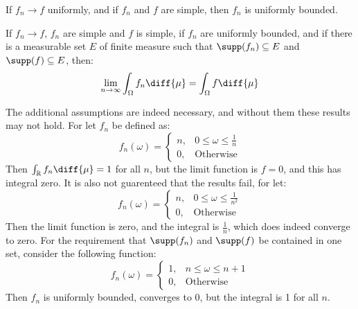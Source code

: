         \begin{theorem}
            If $f_{n}\rightarrow{f}$ uniformly, and if $f_{n}$ and $f$ are
            simple, then $f_{n}$ is uniformly bounded.
        \end{theorem}
        \begin{theorem}
            If $f_{n}\rightarrow{f}$, $f_{n}$ are simple and $f$ is simple, if
            $f_{n}$ are uniformly bounded, and if there is a measurable set $E$
            of finite measure such that $\supp(f_{n})\subseteq{E}$ and
            $\supp(f)\subseteq{E}$, then:
            \begin{equation}
                \underset{n\rightarrow\infty}{\lim}\int_{\Omega}f_{n}\diff{\mu}
                =\int_{\Omega}f\diff{\mu}
            \end{equation}
        \end{theorem}
        \begin{lexample}
            The additional assumptions are indeed necessary, and without them
            these results may not hold. For let $f_{n}$ be defined as:
            \begin{equation}
                f_{n}(\omega)=
                \begin{cases}
                    n,&0\leq\omega\leq\frac{1}{n}\\
                    0,&\textrm{Otherwise}
                \end{cases}
            \end{equation}
            Then $\int_{\mathbb{R}}f_{n}\diff{\mu}=1$ for all $n$, but the limit
            function is $f=0$, and this has integral zero. It is also not
            guarenteed that the results fail, for let:
            \begin{equation}
                f_{n}(\omega)=
                \begin{cases}
                    n,&0\leq\omega\leq\frac{1}{n^{2}}\\
                    0,&\textrm{Otherwise}
                \end{cases}
            \end{equation}
            Then the limit function is zero, and the integral is $\frac{1}{n}$,
            which does indeed converge to zero. For the requirement that
            $\supp(f_{n})$ and $\supp(f)$ be contained in one set, consider the
            following function:
            \begin{equation}
                f_{n}(\omega)=
                \begin{cases}
                    1,&n\leq\omega\leq{n+1}\\
                    0,&\textrm{Otherwise}
                \end{cases}
            \end{equation}
            Then $f_{n}$ is uniformly bounded, converges to $0$, but the
            integral is 1 for all $n$.
        \end{lexample}
